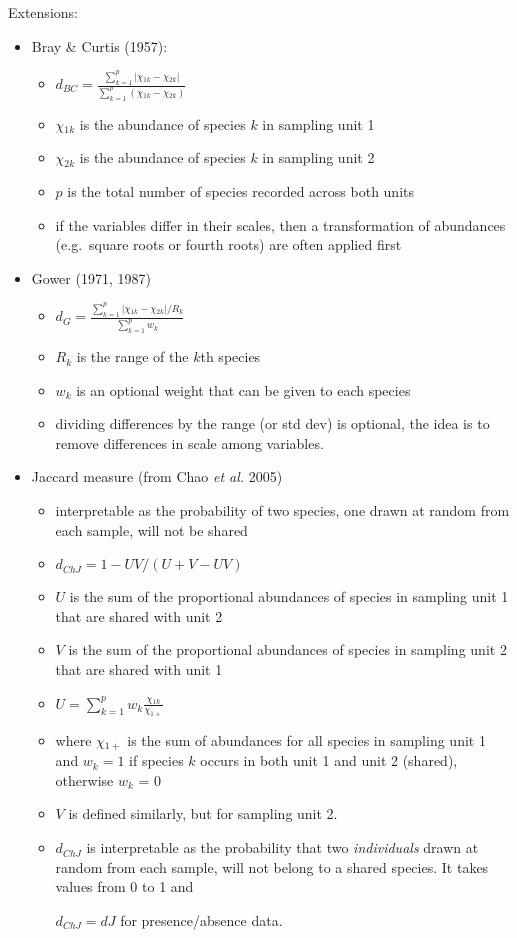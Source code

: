 \documentclass[document.tex]{subfiles}
\begin{document}
Extensions:
\begin{itemize}
    \item Bray \& Curtis (1957):
    \begin{itemize}
        \item $d_{BC} = \frac{\sum_{k=1}^{p}|\chi{}_{1k}-\chi{}_{2k}|}{\sum_{k=1}^{p}(\chi{}_{1k}-\chi{}_{2k})}$
        \item $\chi{}_{1k}$ is the abundance of species $k$ in sampling unit 1
        \item $\chi{}_{2k}$ is the abundance of species $k$ in sampling unit 2
        \item $p$ is the total number of species recorded across both units
        \item if the variables differ in their scales, then a transformation of abundances (e.g.\ square roots or fourth roots) are often applied first
    \end{itemize}

    \item Gower (1971, 1987)
    \begin{itemize}
        \item $d_{G} = \frac{\sum_{k=1}^{p}|\chi{}_{1k}-\chi{}_{2k}|/R_k}{\sum_{k=1}^{p}w_k}$
        \item $R_{k}$ is the range of the $k$th species 
        \item $w_k$ is an optional weight that can be given to each species
        \item dividing differences by the range (or std dev) is optional, 
        the idea is to remove differences in scale among variables.
    \end{itemize}

    \item Jaccard measure (from Chao \textit{et al.} 2005)
    \begin{itemize}
        \item interpretable as the probability of two species, one 
        drawn at random from each sample, will not be shared
        \item $d_{ChJ} = 1 - UV/(U + V - UV)$
        \item $U$ is the sum of the proportional abundances of species
        in sampling unit 1 that are shared with unit 2
        \item $V$ is the sum of the proportional abundances of 
        species in sampling unit 2 that are shared with unit 1
        \item $U = \sum_{k=1}^{p} w_k \frac{\chi{}_{1k}}{\chi{}_{1+}}$
        \item where $\chi{}_{1+}$ is the sum of abundances for all species
        in sampling unit 1 and $w_k=1$ if species $k$ occurs in both unit
        1 and unit 2 (shared), otherwise $w_k$ = 0
        \item $V$ is defined similarly, but for sampling unit 2.
        \item $d_{ChJ}$ is interpretable as the probability that two
        \textit{individuals} drawn at random from each sample, will not
        belong to a shared species. It takes values from 0 to 1 and 

        $d_{ChJ}=dJ$ for presence/absence data.
    \end{itemize}
\end{itemize}

\bib{}
\end{document}
